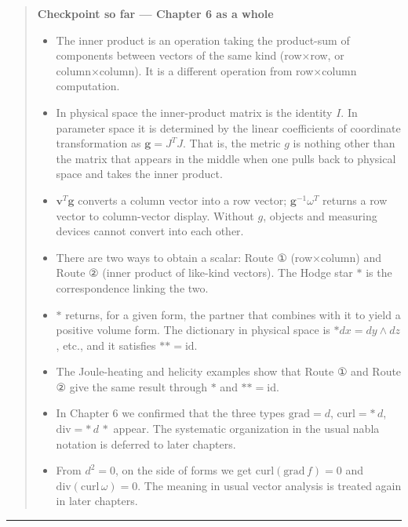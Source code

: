\begin{quote}
\textbf{Checkpoint so far — Chapter 6 as a whole}

\begin{itemize}
\item
  The inner product is an operation taking the product-sum of components
  between vectors of the same kind (row×row, or column×column). It is a
  different operation from row×column computation.
\item
  In physical space the inner-product matrix is the identity \(I\). In
  parameter space it is determined by the linear coefficients of
  coordinate transformation as \(\mathbf{g}=J^T J\). That is, the metric
  \(g\) is nothing other than the matrix that appears in the middle when
  one pulls back to physical space and takes the inner product.
\item
  \(\mathbf{v}^T \mathbf{g}\) converts a column vector into a row
  vector; \(\mathbf{g}^{-1}\omega^T\) returns a row vector to
  column-vector display. Without \(g\), objects and measuring devices
  cannot convert into each other.
\item
  There are two ways to obtain a scalar: Route ① (row×column) and Route
  ② (inner product of like-kind vectors). The Hodge star \(\ast\) is the
  correspondence linking the two.
\item
  \(\ast\) returns, for a given form, the partner that combines with it
  to yield a positive volume form. The dictionary in physical space is
  \(\ast dx = dy \wedge dz\), etc., and it satisfies
  \(\ast\ast = \mathrm{id}\).
\item
  The Joule-heating and helicity examples show that Route ① and Route ②
  give the same result through \(\ast\) and \(\ast\ast = \mathrm{id}\).
\item
  In Chapter 6 we confirmed that the three types \(\mathrm{grad}=d\),
  \(\mathrm{curl}=\ast\,d\), \(\mathrm{div}=\ast\,d\,\ast\) appear. The
  systematic organization in the usual nabla notation is deferred to
  later chapters.
\item
  From \(d^2=0\), on the side of forms we get
  \(\mathrm{curl}(\mathrm{grad}\,f)=0\) and
  \(\mathrm{div}(\mathrm{curl}\,\omega)=0\). The meaning in usual vector
  analysis is treated again in later chapters.
\end{itemize}
\end{quote}

\begin{center}\rule{0.5\linewidth}{0.5pt}\end{center}

